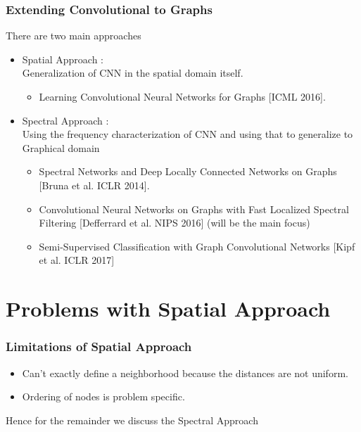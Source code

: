 \documentclass{beamer}
\begin{document}
\begin{frame}
  \frametitle{Extending Convolutional to Graphs}
  There are two main approaches
  \begin{itemize}
  \item <1->Spatial Approach :\\
    Generalization of CNN in the spatial domain itself.
    \begin{itemize}
    \item <1-> Learning Convolutional Neural Networks for Graphs [ICML 2016].%
    \end{itemize}
  \item <2-> Spectral Approach :\\
    Using the frequency characterization of CNN and using that to generalize to Graphical domain
    \begin{itemize}
    \item <2->Spectral Networks and Deep Locally Connected Networks on Graphs [Bruna et al. ICLR 2014]. %
    \item <2->Convolutional Neural Networks on Graphs with Fast Localized Spectral Filtering [Defferrard et al. NIPS 2016] (will be the main focus) %
    \item <2->Semi-Supervised Classification with Graph Convolutional Networks [Kipf et al. ICLR 2017] %
    \end{itemize}
  \end{itemize}
\end{frame}

\section{Problems with Spatial Approach}
\begin{frame}
  \frametitle{Limitations of Spatial Approach}
  \begin{itemize}
  \item Can't exactly define a neighborhood because the distances are not uniform.
  \item Ordering of nodes is problem specific.
  \end{itemize}
  Hence for the remainder we discuss the Spectral Approach
\end{frame}
\end{document}
